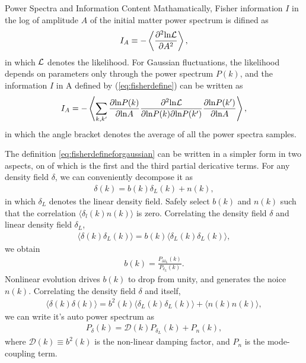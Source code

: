\begin{section}{Power Spectra and Information Content}
   Mathamatically, Fisher information \cite{bib:Tegmark1997} $I$ in the log of amplitude $A$ of the initial 
matter power spectrum is difined as 
\begin{align}
   I_A \equiv -\left\langle \frac{\partial ^2 \mathrm{ln \mathcal{L}}}{\partial A ^2}\right\rangle,
\label{eq:fisherdefine}
\end{align}
   in which $\mathcal{L}$ denotes the likelihood. For Gaussian fluctuations, the likelihood depends on
parameters only through the power spectrum $P(k)$, and the information $I$ in A defined by (\ref{eq:fisherdefine})
can be written as \cite{bib:Rimes2006}
\begin{align}
    I_A = - \left\langle \sum_{k,k'} \frac{\partial \mathrm{ln} P(k)}{\partial \mathrm{ln} A} 
\frac{\partial ^2 \mathrm{ln \mathcal{L}}}{\partial \mathrm{ln} P(k) \partial \mathrm{ln} P(k')}
\frac{\partial \mathrm{ln} P(k')}{\partial \mathrm{ln} A}\right\rangle,
\label{eq:fisherdefineforgaussian}
\end{align}
in which the angle bracket denotes the average of all the power spectra samples.

  The definition \ref{eq:fisherdefineforgaussian} can be written in a simpler form in two aspects, on 
of which is the first and the third partial dericative terms. 
For any density field $\delta$, we can conveniently decompose it as
\begin{align}
    \delta (k) = b (k) \delta _L (k) + n (k),
\label{eq:decompose}
\end{align}
in which $\delta_L$ denotes the linear density field. Safely select $b (k)$ and $n (k)$ 
such that the correlation $\langle \delta_l (k) n (k) \rangle$ is zero. Correlating the density field 
$\delta$ and linear density field $\delta_L$,
\begin{align}
   \langle \delta (k) \delta_L (k) \rangle = b (k) \langle \delta_L (k) \delta_L (k) \rangle,
\label{eq:correlating}
\end{align} 
    we obtain
\begin{align}
    b (k) = \frac{P _{\delta \delta_L}(k)}{P_{\delta_L}(k)}.
\label{eq:bofk}
\end{align}
Nonlinear evolution drives $b (k)$ to drop from unity, and generates the noice $n (k)$. 
Correlating the density field $\delta$ and itself, 
\begin{align}
  \langle \delta (k) \delta (k) \rangle = b^2 (k) \langle \delta_L (k) \delta_L (k) \rangle + \langle n(k)n(k) \rangle,
\end{align}
we can write it's auto power spectrum as
\begin{align}
   P_\delta (k) = \mathcal{D} (k) P_{\delta_L} (k) + P_n (k),
\label{eq:powerdecompose}
\end{align}
where $\mathcal{D}(k) \equiv b^2 (k)$ is the non-linear damping factor, and $P_n$ is the mode-coupling term.


\end{section}
